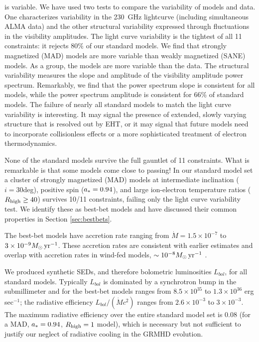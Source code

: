 \sgra is variable.  We have used two tests to compare the variability of models and data. One characterizes variability in the 230~GHz lightcurve (including simultaneous ALMA data) and the other structural variability expressed through fluctuations in the visibility amplitudes.  The light curve variability is the tightest of all 11 constraints: it rejects $80\%$ of our standard models.  We find that strongly magnetized (MAD) models are more variable than weakly magnetized (SANE) models.  As a group, the models are more variable than the data.  The structural variability measures the slope and amplitude of the visibility amplitude power spectrum.  Remarkably, we find that the power spectrum slope is consistent for all models, while the power spectrum amplitude is consistent for 66\% of standard models.  The failure of nearly all standard models to match the light curve variability is interesting.  It may signal the presence of extended, slowly varying structure that is resolved out by EHT, or it may signal that future models need to incorporate collisionless effects or a more sophisticated treatment of electron thermodynamics.

None of the standard models survive the full gauntlet of 11 constraints.  What is remarkable is that some models come close to passing!  In our standard model set a cluster of strongly magnetized (MAD) models at intermediate inclination ($i = 30$deg), positive spin ($a_* = 0.94$), and large ion-electron temperature ratios ($R_\mathrm{high} \ge 40$) survives 10/11 constraints, failing only the light curve variability test.  We identify these as best-bet models and have discussed their common properties in Section \ref{sec:bestbets}.

The best-bet models have accretion rate ranging from $\dot{M} = 1.5 \times 10^{-7}$ to $3 \times 10^{-9} M_\odot \,\mathrm{yr}^{-1}$.  These accretion rates are consistent with earlier estimates and overlap with accretion rates in wind-fed models, $\sim 10^{-8} M_\odot\,\mathrm{yr}^{-1}$ \citep{2020ApJ...896L...6R}.

We produced synthetic SEDs, and therefore bolometric luminosities $L_{bol}$, for all  standard models.  Typically $L_{bol}$ is dominated by a synchrotron bump in the submillimeter and for the best-bet models ranges from $ 8.5\times10^{35}$ to $1.3\times10^{36}$ erg sec$^{-1}$; the radiative  efficiency $L_{bol}/(\dot{M} c^2)$ ranges from $2.6\times10^{-3}$ to $3\times10^{-3}$.  The maximum radiative efficiency over the entire standard model set is $0.08$ (for a MAD, $a_* = 0.94$, $R_\mathrm{high} = 1$ model), which is necessary but not sufficient to justify our neglect of radiative cooling in the GRMHD evolution.

